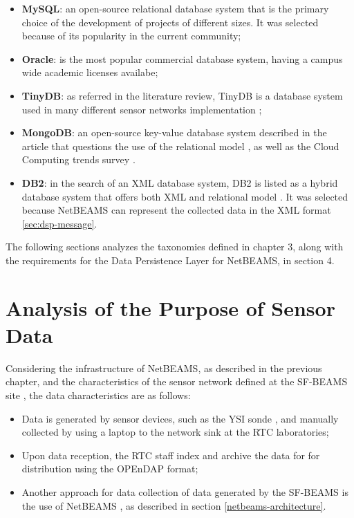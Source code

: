 \begin{itemize}
  \item \textbf{MySQL}: an open-source relational database system that is the
  primary choice of the development of projects of different sizes. It was selected
  because of its popularity in the current community;
  \item \textbf{Oracle}: is the most popular commercial database system, having
  a campus wide academic licenses availabe;
  \item \textbf{TinyDB}\cite{tinydb}: as referred in the literature review,
  TinyDB is a database system used in many different sensor networks implementation
  \cite{sn-db-tinydb};
  \item \textbf{MongoDB}\cite{mongodb}: an open-source key-value database system
  described in the article that questions the use of the relational model
  \cite{db-is-rdbs-dommed}, as well as the Cloud Computing trends survey
  \cite{cloud-comp-architectures}.
  \item \textbf{DB2}\cite{db2}: in the search of an XML database system, DB2 is
  listed as a hybrid database system that offers both XML and relational model
  \cite{db-xml-enabled}. It was selected because NetBEAMS can represent the
  collected data in the XML format \ref{sec:dsp-message}.
\end{itemize}

The following sections analyzes the taxonomies defined in chapter 3, along with
the requirements for the Data Persistence Layer for NetBEAMS, in section 4.

\section{Analysis of the Purpose of Sensor Data}

Considering the infrastructure of NetBEAMS, as described in the previous
chapter, and the characteristics of the sensor network defined at the SF-BEAMS
site \cite{sfbeams2006}, the data characteristics are as follows:

\begin{itemize}
  \item Data is generated by sensor devices, such as the YSI sonde
  \cite{YSI-Sonde}, and manually collected by using a laptop to the network
  sink at the RTC laboratories;
  \item Upon data reception, the RTC staff index and archive the data for
  for distribution using the OPEnDAP format;
  \item Another approach for data collection of data generated by the SF-BEAMS
  is the use of NetBEAMS \cite{netbeams2009}, as described in section
  \ref{netbeams-architecture}.
\end{itemize}

